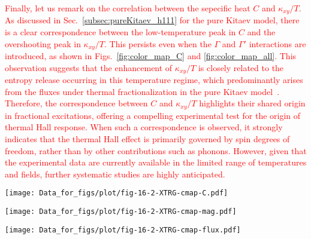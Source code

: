 \documentclass[twocolumn,superscriptaddress,showpacs, longbibliography, aps, prx]{revtex4-2}
\newcommand{\red}[1]{\textcolor{red}{#1}}
\begin{document}
\red{Finally, let us remark on the correlation between the sepecific heat $C$ and $\kappa_{xy}/T$. 
As discussed in Sec.~\ref{subsec:pureKitaev_h111} for the pure Kitaev model, there is a clear correspondence between the low-temperature peak in $C$ and the overshooting peak in $\kappa_{xy}/T$. 
This persists even when the $\Gamma$ and $\Gamma'$ interactions are introduced, as shown in Figs.~\ref{fig:color_map_C} and \ref{fig:color_map_all}. 
This observation suggests that the enhancement of $\kappa_{xy}/T$ is closely related to the entropy release occurring in this temperature regime, which predominantly arises from the fluxes under thermal fractionalization in the pure Kitaev model~\cite{NasuUM2015}. 
Therefore, the correspondence between $C$ and $\kappa_{xy}/T$ highlights their shared origin in fractional excitations, offering a compelling experimental test for the origin of thermal Hall response. 
When such a correspondence is observed, it strongly indicates that the thermal Hall effect is primarily governed by spin degrees of freedom, rather than by other contributions such as phonons. 
However, given that the experimental data are currently available in the limited range of temperatures and fields, further systematic studies are highly anticipated.} 

\begin{figure*}[htb]
  \begin{center}
    \texttt{[image: Data\_for\_figs/plot/fig-16-2-XTRG-cmap-C.pdf]}
  \end{center}
  \caption{
Color maps of the specific heat for the pure Kitaev model on the field-temperature plane with (a)-(e) $\Gamma=0$ and varying $\Gamma'$ and  (f)-(i) varying $\Gamma$ and $\Gamma'=0$.}
  \label{fig:color_map_C}
\end{figure*}

\begin{figure*}[htb]
  \begin{center}
    \texttt{[image: Data\_for\_figs/plot/fig-16-2-XTRG-cmap-mag.pdf]}
  \end{center}
  \caption{
Color maps of the magnetization, corresponding to Fig.~\ref{fig:color_map_C}.} 
  \label{fig:color_map_mag}
\end{figure*}

\begin{figure*}[htb]
  \begin{center}
    \texttt{[image: Data\_for\_figs/plot/fig-16-2-XTRG-cmap-flux.pdf]}
  \end{center}
  \caption{
Color maps of the flux density, corresponding to Fig.~\ref{fig:color_map_C}.} 
  \label{fig:color_map_flux}
\end{figure*}
\end{document}
